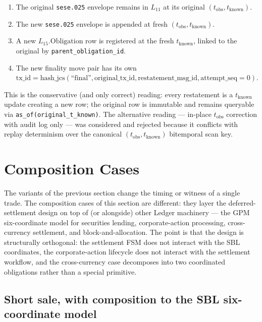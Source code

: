 \documentclass[11pt,a4paper]{article}
\begin{document}
\begin{enumerate}[nosep]
\item The original \texttt{sese.025} envelope remains in $L_{11}$ at its original $(t_{\mathrm{obs}}, t_{\mathrm{known}})$.
\item The new \texttt{sese.025} envelope is appended at fresh $(t_{\mathrm{obs}}, t_{\mathrm{known}})$.
\item A new $L_{15}.\mathrm{Obligation}$ row is registered at the fresh $t_{\mathrm{known}}$, linked to the original by \texttt{parent\_obligation\_id}.
\item The new finality move pair has its own $\mathrm{tx\_id} = \mathrm{hash\_jcs}(\text{``final''}, \mathrm{original\_tx\_id}, \mathrm{restatement\_msg\_id}, \mathrm{attempt\_seq}=0)$.
\end{enumerate}

This is the conservative (and only correct) reading: every restatement is a $t_{\mathrm{known}}$ update creating a new row; the original row is immutable and remains queryable via \texttt{as\_of(original\_t\_known)}. The alternative reading --- in-place $t_{\mathrm{obs}}$ correction with audit log only --- was considered and rejected because it conflicts with replay determinism over the canonical $(t_{\mathrm{obs}}, t_{\mathrm{known}})$ bitemporal scan key.

\clearpage
\section{Composition Cases}
\label{sec:composition}

The variants of the previous section change the timing or witness of a single trade. The composition cases of this section are different: they layer the deferred-settlement design on top of (or alongside) other Ledger machinery --- the GPM six-coordinate model for securities lending, corporate-action processing, cross-currency settlement, and block-and-allocation. The point is that the design is structurally orthogonal: the settlement FSM does not interact with the SBL coordinates, the corporate-action lifecycle does not interact with the settlement workflow, and the cross-currency case decomposes into two coordinated obligations rather than a special primitive.

\subsection{Short sale, with composition to the SBL six-coordinate model}
\label{sec:composition-short}
\end{document}

